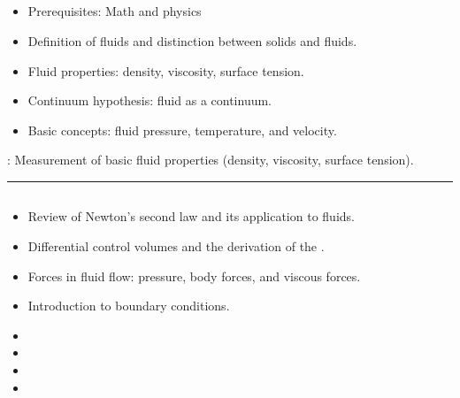 \documentclass[letterpaper,10pt,english]{jupyterBook}
\begin{document}
\subsection{}
\label{\detokenize{syllabus:weeks-1-2-introduction-to-fluid-mechanics-and-properties}}\begin{itemize}
\item {} 
\sphinxAtStartPar
Prerequisites: Math and physics

\item {} 
\sphinxAtStartPar
Definition of fluids and distinction between solids and fluids.

\item {} 
\sphinxAtStartPar
Fluid properties: density, viscosity, surface tension.

\item {} 
\sphinxAtStartPar
Continuum hypothesis: fluid as a continuum.

\item {} 
\sphinxAtStartPar
Basic concepts: fluid pressure, temperature, and velocity.

\end{itemize}

\sphinxAtStartPar
{}: Measurement of basic fluid properties (density, viscosity, surface tension).


\bigskip\hrule\bigskip



\subsection{}
\label{\detokenize{syllabus:weeks-3-4-differential-analysis-and-navier-stokes-equations}}\begin{itemize}
\item {} 
\sphinxAtStartPar
Review of Newton’s second law and its application to fluids.

\item {} 
\sphinxAtStartPar
Differential control volumes and the derivation of the .

\item {} 
\sphinxAtStartPar
Forces in fluid flow: pressure, body forces, and viscous forces.

\item {} 
\sphinxAtStartPar
Introduction to boundary conditions.

\item {} 
\item {} 
\item {} 
\item {} 
\end{itemize}
\end{document}
